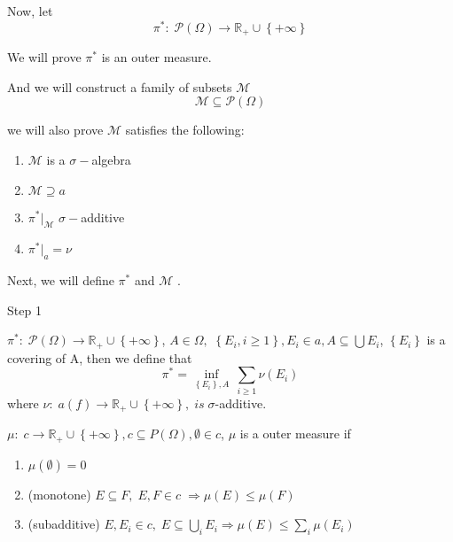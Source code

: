  
Now, let
 \begin{equation}
 {\pi ^*}:\;\mathcal{P}\left( \Omega  \right) \to {\mathbb{R}_ + } \cup \left\{ { + \infty } \right\}
 \label{eq4.6}
 \end{equation}
 
We will prove $ {\pi ^*} $ is an outer measure.

And we will construct a family of subsets $ \mathcal{M} $
\begin{equation}
\mathcal{M} \subseteq  \mathcal{P}\left(\Omega\right)
\label{eq4.7}
\end{equation}

we will also prove $ \mathcal{M} $ satisfies the following:
\begin{enumerate}
	\item $ \mathcal{M} $ is a $ \sigma- $algebra
	\item $ \mathcal{M}  \supseteq a$
	\item ${\pi ^*}{|_\mathcal{M}}$ $ \sigma- $additive
	\item ${\pi ^*}{|_a} = \nu $
\end{enumerate}

Next, we will define $ {\pi ^*} $ and $ \mathcal{M} $ .
\newpage 
 
 {\large Step 1}

\begin{definition}[$ {\pi ^*} $]
	$ {\pi ^*}:\;\mathcal{P}\left( \Omega  \right) \to {\mathbb{R}_ + } \cup \left\{ { + \infty } \right\} $, 
	$ A \in \Omega, $ $\left\{ {{E_i},i \geqslant 1} \right\},{E_i} \in a,A \subseteq \bigcup {{E_i}} $, $\left\{ {{E_i}} \right\}$ is a covering of A, then we define that
	\begin{equation}
	{\pi ^*} = \mathop {\inf }\limits_{\left\{ {{E_i}} \right\},A} \ \sum\limits_{i \geqslant 1} {\nu \left( {{E_i}} \right)} 
	\label{eq4.8}
	\end{equation}
	where $\nu :\;a\left( f \right) \to {\mathbb{R}_ + } \cup \left\{ { + \infty } \right\},\; is \; \sigma $-additive. 
	\label{def4.1}
\end{definition}



\begin{definition}
	$\mu :\;c \to {\mathbb{R}_ + } \cup \left\{ { + \infty } \right\},c \subseteq P\left( \Omega  \right),\emptyset  \in c$, $ \mu  $ is a outer measure if
	\begin{enumerate}
		\item $\mu \left( \emptyset  \right) = 0$
		\item (monotone) $E \subseteq F,\;E,F \in c\; \Rightarrow \mu \left( E \right) \leqslant \mu \left( F \right)$
		\item (subadditive) $E,{E_i} \in c,\;E \subseteq \bigcup\limits_i {{E_i}}  \Rightarrow \mu \left( E \right) \leqslant \sum\limits_i {\mu \left( {{E_i}} \right)} $
	\end{enumerate}
	\label{def4.2}
\end{definition}

